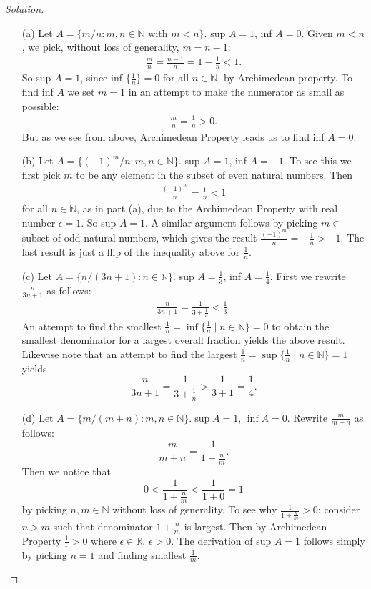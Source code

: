 \documentclass[11pt,twoside, reqno, align]{amsart}
\theoremstyle{remark}
\def\R{\mathbb R}
\def\N{\mathbb N}
\begin{document}
\begin{proof}[Solution]\;
\begin{enumerate}
    \item[(a)] Let $A = \{m/n : m,n \in \N \text{ with } m < n\}$. sup $A = 1$, inf $A = 0$. Given $m < n$, we pick, without loss of generality, $m = n-1$:
    \begin{align*}
        \frac{m}{n} = \frac{n-1}{n} = 1 - \frac{1}{n} < 1.
    \end{align*}
    So sup $A = 1$, since inf $\{\frac{1}{n}\} = 0$ for all $n \in \N$, by Archimedean property. To find inf $A$ we set $m = 1$ in an attempt to make the numerator as small as possible:
    \begin{align*}
        \frac{m}{n} = \frac{1}{n} > 0.
    \end{align*}
    But as we see from above, Archimedean Property leads us to find inf $A = 0$.
    \item[(b)] Let $A = \{(-1)^m/n : m,n \in \N\}$. sup $A = 1$, inf $A = -1$. To see this we first pick $m$ to be any element in the subset of even natural numbers. Then
    \begin{align*}
        \frac{(-1)^m}{n} = \frac{1}{n} < 1
    \end{align*}
    for all $n \in \N$, as in part (a), due to the Archimedean Property with real number $\epsilon = 1$. So sup $A = 1$. A similar argument follows by picking $m \in$ subset of odd natural numbers, which gives the result $\frac{(-1)^m}{n} = -\frac{1}{n} > -1$. The last result is just a flip of the inequality above for $\frac{1}{n}$.
    \item[(c)] Let $A = \{n/(3n+1) : n \in \N\}$. sup $A = \frac{1}{3}$, inf $A = \frac{1}{4}$. First we rewrite $\frac{n}{3n+1}$ as follows:
    \begin{align*}
        \frac{n}{3n+1} = \frac{1}{3 + \frac{1}{n}} < \frac{1}{3}.
    \end{align*}
    An attempt to find the smallest $\frac{1}{n} = \inf \{\frac{1}{n} \mid n \in \N\} = 0$ to obtain the smallest denominator for a largest overall fraction yields the above result. Likewise note that an attempt to find the largest $\frac{1}{n} = \sup \{\frac{1}{n} \mid n \in \N\} = 1$ yields
    $$
        \frac{n}{3n+1} = \frac{1}{3 + \frac{1}{n}} > \frac{1}{3 + 1} = \frac{1}{4}.
    $$
    \item[(d)] Let $A = \{m/(m+n) : m,n \in \N\}. \sup A = 1$, $ \inf A = 0$. Rewrite $\frac{m}{m+n}$ as follows:
    $$
    \frac{m}{m+n} = \frac{1}{1 + \frac{n}{m}}.
    $$
    Then we notice that
    $$
    0 < \frac{1}{1+\frac{n}{m}} < \frac{1}{1 + 0} = 1
    $$
    by picking $n,m \in \N$ without loss of generality. To see why $\frac{1}{1 + \frac{n}{m}} > 0$: consider $n > m$ such that denominator $1 + \frac{n}{m}$ is largest. Then by Archimedean Property $\frac{1}{\epsilon} > 0$ where $\epsilon \in \R$, $\epsilon > 0$. The derivation of sup $A = 1$ follows simply by picking $n = 1$ and finding smallest $\frac{1}{m}$.
\end{enumerate}
\end{proof}
\end{document}
